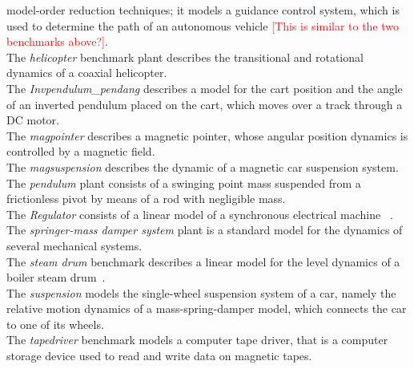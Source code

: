 \documentclass[twocolumn]{autart}    %
\renewcommand{\note}[1]{\textcolor{red}{[#1]}}
\begin{document}
model-order reduction techniques; it models a guidance control system, 
which is used to determine the path of an autonomous vehicle \note{This is similar to the two benchmarks above?}. \\ 
The \textit{helicopter} benchmark plant  describes the transitional and rotational dynamics 
of a coaxial helicopter. \\ 
%
The \textit{Invpendulum\_pendang}  
describes a model for the cart position and the angle of an inverted pendulum placed on the cart,  
which moves over a track through a DC motor. \\ 
%
The \textit{magpointer}  describes a magnetic pointer, 
whose angular position dynamics is controlled by a magnetic field. \\ 
%
The \textit{magsuspension} describes  the dynamic of a magnetic car suspension system. \\
The \textit{pendulum}  plant consists of a swinging point mass suspended from a frictionless pivot by means of a rod with negligible mass.  \\ 
%
The \textit{Regulator} consists of a linear model of a synchronous electrical machine%
~\cite{KOKOTOVIC198023}. \\
The \textit{springer-mass damper system} plant is a standard model for the dynamics of several mechanical systems. \\ 
The \textit{steam drum} benchmark describes a linear model for the level dynamics of a boiler steam drum~\cite{boiler}. \\ 
%
The \textit{suspension} models the single-wheel suspension system of a car, 
namely the relative motion dynamics of a mass-spring-damper model, which connects the car to one of its wheels.  \\
The \textit{tapedriver} benchmark models a computer tape driver, 
that is a computer storage device used to read and write data on magnetic tapes. 

\end{document}
